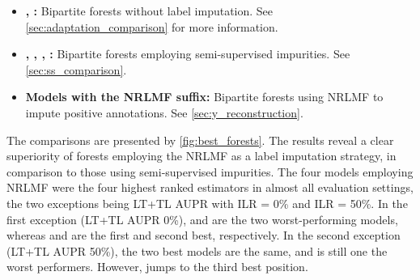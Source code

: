 \begin{itemize}
    \item \textbf{, :}
    Bipartite forests without label imputation.
    See \autoref{sec:adaptation_comparison} for more information.
    \item \textbf{, , , :}
    Bipartite forests employing semi-supervised impurities.
    See \autoref{sec:ss_comparison}.
    \item \textbf{Models with the NRLMF suffix:} 
    Bipartite forests using NRLMF to impute positive annotations.
    See \autoref{sec:y_reconstruction}.
\end{itemize}



The comparisons are presented by \autoref{fig:best_forests}. The results reveal a clear superiority of forests employing the NRLMF as a label imputation strategy, in comparison to those using semi-supervised impurities. The four models employing NRLMF were the four highest ranked estimators in almost all evaluation settings, the two exceptions being LT+TL AUPR with ILR = 0\% and ILR = 50\%. In the first exception (LT+TL AUPR 0\%),  and  are the two worst-performing models, whereas  and  are the first and second best, respectively. In the second exception (LT+TL AUPR 50\%), the two best models are the same, and  is still one the worst performers. However,  jumps to the third best position. 



